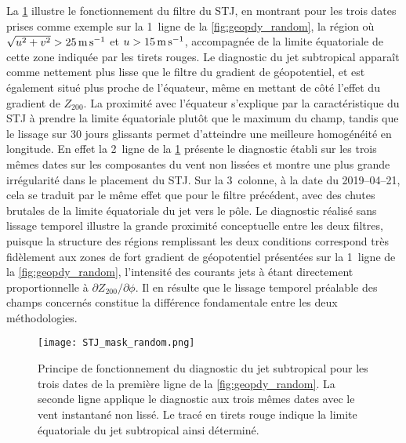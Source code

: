 \documentclass[../main.tex]{subfiles}
\begin{document}
La \cref{fig:STJ_random} illustre le fonctionnement du filtre du STJ, en montrant pour les trois dates prises comme exemple sur la 1\iere~ligne de la
\cref{fig:geopdy_random}, la région où \mbox{$\sqrt{u^2 + v^2} > \SI{25}{\metre\per\second}$} et \mbox{$u > \SI{15}{\metre\per\second}$}, accompagnée de la limite équatoriale de cette zone indiquée
par les tirets rouges. Le diagnostic du jet subtropical apparaît comme nettement plus lisse que le filtre du gradient de géopotentiel, et est également situé
plus proche de l'équateur, même en mettant de côté l'effet  du gradient de $Z_{200}$. La proximité avec l'équateur s'explique par la
caractéristique du STJ à prendre la limite équatoriale plutôt que le maximum du champ, tandis que le lissage sur 30 jours glissants permet d'atteindre une
meilleure homogénéité en longitude. En effet la 2\ieme~ligne de la \cref{fig:STJ_random} présente le diagnostic établi sur les trois mêmes dates sur les
composantes du vent non lissées et montre une plus grande irrégularité dans le placement du STJ. Sur la 3\ieme~colonne, à la date du 2019--04--21, cela se
traduit par le même effet que pour le filtre précédent, avec des chutes brutales de la limite équatoriale du jet vers le pôle. Le diagnostic réalisé sans
lissage temporel illustre la grande proximité conceptuelle entre les deux filtres, puisque la structure des régions remplissant les deux conditions correspond
très fidèlement aux zones de fort gradient de géopotentiel présentées sur la 1\iere~ligne de la \cref{fig:geopdy_random}, l'intensité des courants jets à
 étant directement proportionnelle à $\partial Z_{200} / \partial \phi$. Il en résulte que le lissage temporel préalable des champs concernés constitue
la différence fondamentale entre les deux méthodologies.

\begin{figure}[tb]
    \centering
    \texttt{[image: STJ\_mask\_random.png]}
    \caption{Principe de fonctionnement du diagnostic du jet subtropical pour les trois dates de la première ligne de la \cref{fig:geopdy_random}. La seconde
    ligne applique le diagnostic aux trois mêmes dates avec le vent instantané non lissé. Le tracé en tirets rouge indique la limite équatoriale du jet
    subtropical ainsi déterminé.}
    \label{fig:STJ_random}
\end{figure}
\end{document}
